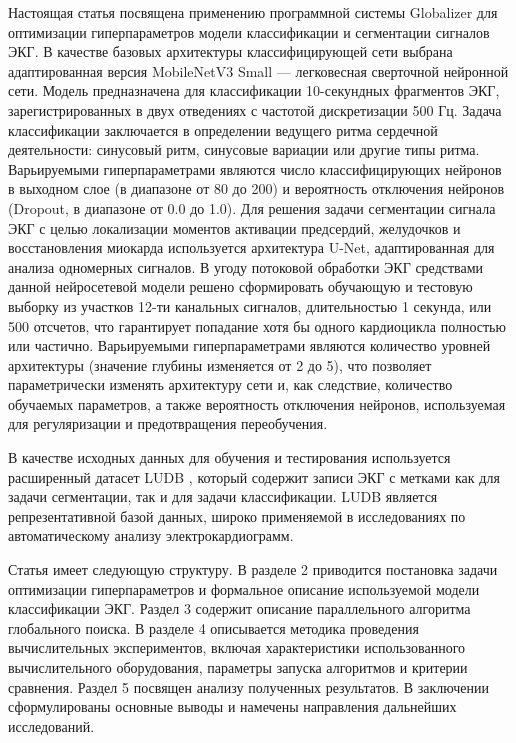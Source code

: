 \documentclass[11pt, oneside, a4paper]{article}
\begin{document}
Настоящая статья посвящена применению программной системы Globalizer для оптимизации гиперпараметров модели классификации и сегментации сигналов ЭКГ. В качестве базовых архитектуры классифицирующей сети выбрана адаптированная версия MobileNetV3 Small --- легковесная сверточной нейронной сети. Модель предназначена для классификации 10-секундных фрагментов ЭКГ, зарегистрированных в двух отведениях с частотой дискретизации 500 Гц. Задача классификации заключается в определении ведущего ритма сердечной деятельности: синусовый ритм, синусовые вариации или другие типы ритма. Варьируемыми гиперпараметрами являются число классифицирующих нейронов в выходном слое (в диапазоне от 80 до 200) и вероятность отключения нейронов (Dropout, в диапазоне от 0.0 до 1.0). Для решения задачи сегментации сигнала ЭКГ с целью локализации моментов активации предсердий, желудочков и восстановления миокарда используется архитектура U-Net, адаптированная для анализа одномерных сигналов. В угоду потоковой обработки ЭКГ средствами данной нейросетевой модели решено сформировать обучающую и тестовую выборку из участков 12-ти канальных сигналов, длительностью 1 секунда, или 500 отсчетов, что гарантирует попадание хотя бы одного кардиоцикла полностью или частично. Варьируемыми гиперпараметрами являются количество уровней архитектуры (значение глубины изменяется от 2 до 5), что позволяет параметрически изменять архитектуру сети и, как следствие, количество обучаемых параметров, а также вероятность отключения нейронов, используемая для регуляризации и предотвращения переобучения.


В качестве исходных данных для обучения и тестирования используется расширенный датасет LUDB \cite{Kalyakulina2020}, который содержит записи ЭКГ с метками как для задачи сегментации, так и для задачи классификации. LUDB является репрезентативной базой данных, широко применяемой в исследованиях по автоматическому анализу электрокардиограмм.

Статья имеет следующую структуру. В разделе 2 приводится постановка задачи оптимизации гиперпараметров и формальное описание используемой модели классификации ЭКГ. Раздел 3 содержит описание параллельного алгоритма глобального поиска. В разделе 4 описывается методика проведения вычислительных экспериментов, включая характеристики использованного вычислительного оборудования, параметры запуска алгоритмов и критерии сравнения. Раздел 5 посвящен анализу полученных результатов. В заключении сформулированы основные выводы и намечены направления дальнейших исследований.
\end{document}
